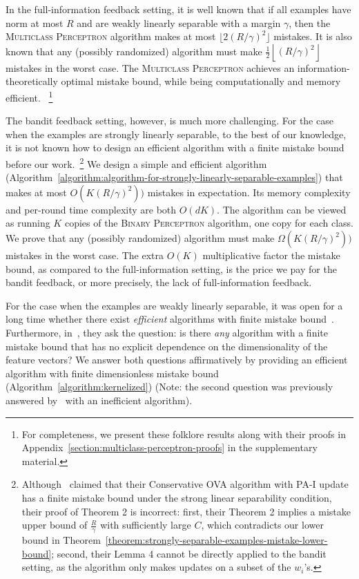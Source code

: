 In the full-information feedback setting, it is well known
\citep{Crammer-Singer-2003} that if all examples have norm at most $R$ and are
weakly linearly separable with a margin $\gamma$, then the \textsc{Multiclass
Perceptron} algorithm makes at most $\lfloor 2(R/\gamma)^2 \rfloor$ mistakes.
It is also known that any (possibly randomized) algorithm must
make $\frac{1}{2} \left\lfloor (R/\gamma)^2 \right \rfloor$ mistakes in the
worst case.
The \textsc{Multiclass Perceptron} achieves an
information-theoretically optimal mistake bound, while being
computationally and memory efficient.
~\footnote{
For completeness, we present these 
folklore
results along
with their proofs in Appendix~\ref{section:multiclass-perceptron-proofs} in the
supplementary material.}

The bandit feedback setting, however, is much more challenging. For the case
when the examples are strongly linearly separable, to the best of our knowledge,
it is not known how to design an efficient algorithm with a finite mistake bound
before our work.~\footnote{Although~\cite{Chen-Chen-Zhang-Chen-Zhang-2009}
claimed that their Conservative OVA algorithm with PA-I update has a finite
mistake bound under the strong linear separability condition, their proof of
Theorem 2 is incorrect: first, their Theorem 2
implies a mistake upper bound of $\frac{R}{\gamma}$ with
sufficiently large $C$, which contradicts our lower
bound in Theorem~\ref{theorem:strongly-separable-examples-mistake-lower-bound};
second, their Lemma 4 cannot be directly applied to the bandit
setting, as the algorithm only makes updates on a subset of the $w_i$'s.} We
design a simple and efficient algorithm
(Algorithm~\ref{algorithm:algorithm-for-strongly-linearly-separable-examples})
that makes at most $O(K (R/\gamma)^2))$ mistakes in expectation. Its memory
complexity and per-round time complexity are both $O(dK)$. The algorithm can be
viewed as running $K$ copies of the \textsc{Binary Perceptron} algorithm, one
copy for each class. We prove that any (possibly randomized) algorithm must make
$\Omega(K (R/\gamma)^2))$ mistakes in the worst case. The extra $O(K)$
multiplicative factor the mistake bound, as compared to the full-information
setting, is the price we pay for the bandit feedback, or more precisely, the
lack of full-information feedback.

For the case when the examples are weakly linearly separable, it was open for a long 
time whether there exist \textit{efficient} algorithms with finite mistake 
bound~\cite{Kakade-Shalev-Shwartz-Tewari-2008, Beygelzimer-Orabona-Zhang-2017}. 
Furthermore, in~\cite{Kakade-Shalev-Shwartz-Tewari-2008}, they ask the question:
is there \textit{any} algorithm with a finite mistake bound that has no explicit dependence 
on the dimensionality of the feature vectors? We answer both questions affirmatively by
providing an efficient algorithm with finite dimensionless mistake bound 
(Algorithm~\ref{algorithm:kernelized}) (Note: the second question was previously 
answered by~\cite{Daniely-Helbertal-2013} with an inefficient algorithm). 

